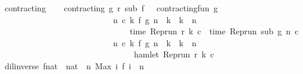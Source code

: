 \begin{isabellebody}
\isanewline
{}\isamarkupfalse%
\ contracting\isanewline
{}\ \isanewline
\ \ {\isacartoucheopen}contracting\ g\ r\ sub\ f\ {\isasymequiv}\ \ contracting{\isacharunderscore}fun\ g\isanewline
\ \ \ \ \ \ \ \ \ \ \ \ \ \ \ \ \ \ \ \ \ \ \ \ \ \ {\isasymand}\ {\isacharparenleft}{\isasymforall}n\ c\ k{\isachardot}\ f\ {\isacharparenleft}g\ n{\isacharparenright}\ {\isasymle}\ k\ {\isasymand}\ k\ {\isasymle}\ n\isanewline
\ \ \ \ \ \ \ \ \ \ \ \ \ \ \ \ \ \ \ \ \ \ \ \ \ \ \ \ \ \ {\isasymlongrightarrow}\ time\ {\isacharparenleft}{\isacharparenleft}Rep{\isacharunderscore}run\ r{\isacharparenright}\ k\ c{\isacharparenright}\ {\isacharequal}\ time\ {\isacharparenleft}{\isacharparenleft}Rep{\isacharunderscore}run\ sub{\isacharparenright}\ {\isacharparenleft}g\ n{\isacharparenright}\ c{\isacharparenright}{\isacharparenright}\isanewline
\ \ \ \ \ \ \ \ \ \ \ \ \ \ \ \ \ \ \ \ \ \ \ \ \ \ {\isasymand}\ {\isacharparenleft}{\isasymforall}n\ c\ k{\isachardot}\ f\ {\isacharparenleft}g\ n{\isacharparenright}\ {\isacharless}\ k\ {\isasymand}\ k\ {\isasymle}\ n\isanewline
\ \ \ \ \ \ \ \ \ \ \ \ \ \ \ \ \ \ \ \ \ \ \ \ \ \ \ \ \ \ {\isasymlongrightarrow}\ {\isasymnot}\ hamlet\ {\isacharparenleft}{\isacharparenleft}Rep{\isacharunderscore}run\ r{\isacharparenright}\ k\ c{\isacharparenright}{\isacharparenright}{\isacartoucheclose}\isanewline
\isanewline
{}\isamarkupfalse%
\ {\isacartoucheopen}dil{\isacharunderscore}inverse\ f{\isacharcolon}{\isacharcolon}{\isacharparenleft}nat\ {\isasymRightarrow}\ nat{\isacharparenright}\ {\isasymequiv}\ {\isacharparenleft}{\isasymlambda}n{\isachardot}\ Max\ {\isacharbraceleft}i{\isachardot}\ f\ i\ {\isasymle}\ n{\isacharbraceright}{\isacharparenright}{\isacartoucheclose}\isanewline
%
\isadelimtheory
\isanewline
%
\endisadelimtheory
%
\isatagtheory
{}\isamarkupfalse%
%
\endisatagtheory
{\isafoldtheory}%
%
\isadelimtheory
%
\endisadelimtheory
%
\end{isabellebody}%
\endinput
